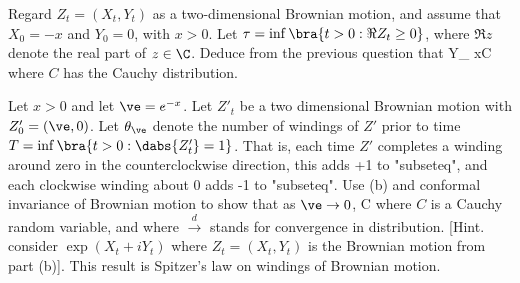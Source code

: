 \item [(b)] Regard $Z_t = (X_t, Y_t)$ as a two-dimensional Brownian motion, and assume that $X_0 = -x$ and $Y_0 = 0$, with $x > 0$. Let $\tau = \inf\bra{t > 0 : \Re Z_t \geq 0}$, where $\Re z$ denote the real part of $z \in \C$. Deduce from the previous question that
\be
Y_\tau {} xC
\ee
where $C$ has the Cauchy distribution.
\item [(c)] Let $x > 0$ and let $\ve = e^{-x}$. Let $Z'_t$ be a two dimensional Brownian motion with $Z'_0 = (\ve, 0)$. Let $\theta_\ve$ denote the number of windings of $Z'$ prior to time $T = \inf\bra{t >0 : \dabs{Z'_t} = 1}$. That is, each time $Z'$ completes a winding around zero in the counterclockwise direction, this adds +1 to "subseteq", and each clockwise winding about 0 adds -1 to "subseteq". Use (b) and conformal invariance of Brownian motion to show
that as $\ve \to 0$,
\be
\frac{\theta_\ve}{\log \ve}  C
\ee
where $C$ is a Cauchy random variable, and where $\stackrel{d}{\to}$ stands for convergence in distribution. [Hint. consider $\exp(X_t + iY_t)$ where $Z_t = (X_t, Y_t)$ is the Brownian motion from part (b)]. This result is Spitzer's law on windings of Brownian motion.
\een


